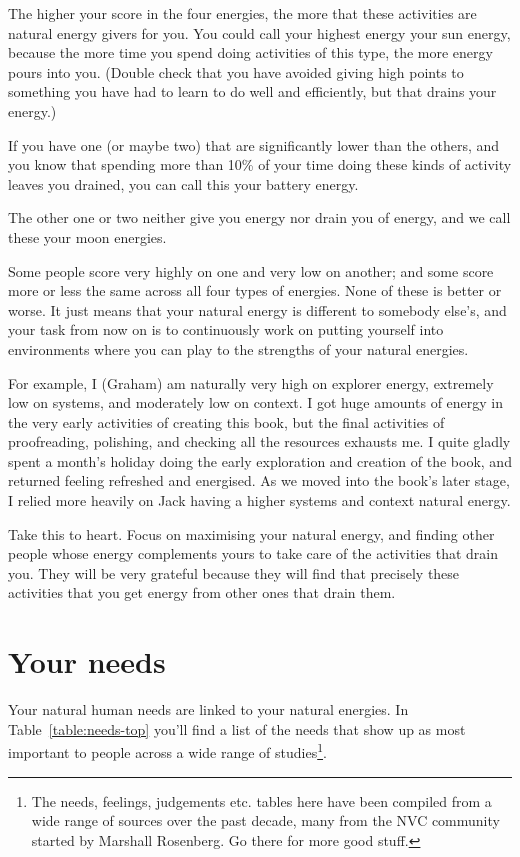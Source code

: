 The higher your score in the four energies, the more that these activities are natural energy givers for you. You could call your highest energy your sun energy, because the more time you spend doing activities of this type, the more energy pours into you. (Double check that you have avoided giving high points to something you have had to learn to do well and efficiently, but that drains your energy.)


If you have one (or maybe two) that are significantly lower than the others, and you know that spending more than 10\% of your time doing these kinds of activity leaves you drained, you can call this your battery energy.


The other one or two neither give you energy nor drain you of energy, and we call these your moon energies.


Some people score very highly on one and very low on another; and some score more or less the same across all four types of energies. None of these is better or worse. It just means that your natural energy is different to somebody else's, and your task from now on is to continuously work on putting yourself into environments where you can play to the strengths of your natural energies.


For example, I (Graham) am naturally very high on explorer energy, extremely low on systems, and moderately low on context. I got huge amounts of energy in the very early activities of creating this book, but the final activities of proofreading, polishing, and checking all the resources exhausts me. I quite gladly spent a month's holiday doing the early exploration and creation of the book, and returned feeling refreshed and energised. As we moved into the book’s later stage, I relied more heavily on Jack having a higher systems and context natural energy.


Take this to heart. Focus on maximising your natural energy, and finding other people whose energy  complements yours to take care of the activities that drain you. They will be very grateful because they will find that precisely these activities that you get energy from other ones that drain them. 
\section{Your needs}
\label{section:needs} 
Your natural human needs are linked to your natural energies. In Table~\ref{table:needs-top} you’ll find a list of the needs that show up as most important to people across a wide range of studies\footnote{The needs, feelings, judgements etc. tables here have been compiled from a wide range of sources over the past decade, many from the NVC community\cite{CNVC, rosenberg-nvc, little-total-honesty} started by Marshall Rosenberg. Go there for more good stuff.}. 



